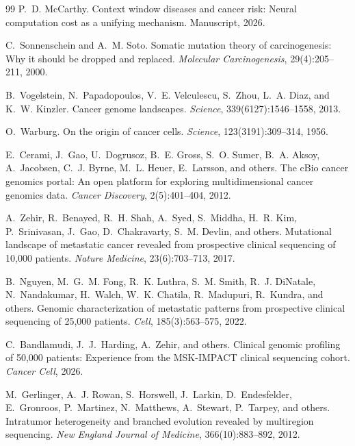 \documentclass[11pt]{article}
\begin{document}
\begin{thebibliography}{99}
P.~D. McCarthy.
\newblock Context window diseases and cancer risk: Neural computation
  cost as a unifying mechanism.
\newblock Manuscript, 2026.

C.~Sonnenschein and A.~M. Soto.
\newblock Somatic mutation theory of carcinogenesis: Why it should be dropped
  and replaced.
\newblock \emph{Molecular Carcinogenesis}, 29(4):205--211, 2000.

B.~Vogelstein, N.~Papadopoulos, V.~E. Velculescu, S.~Zhou, L.~A. Diaz, and
  K.~W. Kinzler.
\newblock Cancer genome landscapes.
\newblock \emph{Science}, 339(6127):1546--1558, 2013.

O.~Warburg.
\newblock On the origin of cancer cells.
\newblock \emph{Science}, 123(3191):309--314, 1956.

E.~Cerami, J.~Gao, U.~Dogrusoz, B.~E. Gross, S.~O. Sumer,
  B.~A. Aksoy, A.~Jacobsen, C.~J. Byrne, M.~L. Heuer,
  E.~Larsson, and others.
\newblock The {cBio} cancer genomics portal: An open platform for
  exploring multidimensional cancer genomics data.
\newblock \emph{Cancer Discovery}, 2(5):401--404, 2012.

A.~Zehir, R.~Benayed, R.~H. Shah, A.~Syed, S.~Middha,
  H.~R. Kim, P.~Srinivasan, J.~Gao, D.~Chakravarty,
  S.~M. Devlin, and others.
\newblock Mutational landscape of metastatic cancer revealed from
  prospective clinical sequencing of 10,000 patients.
\newblock \emph{Nature Medicine}, 23(6):703--713, 2017.

B.~Nguyen, M.~G.~M. Fong, R.~K. Luthra, S.~M. Smith,
  R.~J. DiNatale, N.~Nandakumar, H.~Walch, W.~K. Chatila,
  R.~Madupuri, R.~Kundra, and others.
\newblock Genomic characterization of metastatic patterns from
  prospective clinical sequencing of 25,000 patients.
\newblock \emph{Cell}, 185(3):563--575, 2022.

C.~Bandlamudi, J.~J.~Harding, A.~Zehir, and others.
\newblock Clinical genomic profiling of 50,000 patients:
  Experience from the {MSK-IMPACT} clinical sequencing cohort.
\newblock \emph{Cancer Cell}, 2026.

M.~Gerlinger, A.~J. Rowan, S.~Horswell, J.~Larkin, D.~Endesfelder,
  E.~Gronroos, P.~Martinez, N.~Matthews, A.~Stewart, P.~Tarpey, and others.
\newblock Intratumor heterogeneity and branched evolution revealed by
  multiregion sequencing.
\newblock \emph{New England Journal of Medicine}, 366(10):883--892, 2012.


\end{thebibliography}
\end{document}

